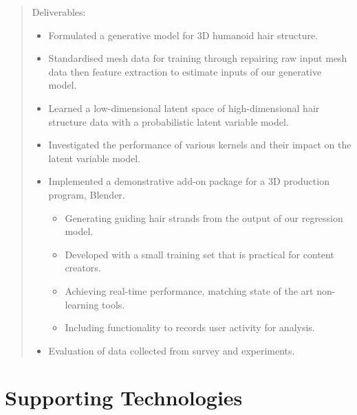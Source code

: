 \documentclass[ %
author={Dillon Keith Diep},
supervisor={Dr. Carl Henrik Ek},
degree={MEng},
title={ART-CG Hair:},
subtitle={Assisted Real-time Content Generation of Stylised Virtual Hair},
type={Research},
year={2017} ]{dissertation}
\begin{document}
	\begin{quote}
		Deliverables:
		\begin{itemize}
			\item Formulated a generative model for 3D humanoid hair structure.
			\item Standardised mesh data for training through repairing raw input mesh data then feature extraction to estimate inputs of our generative model.
			\item Learned a low-dimensional latent space of high-dimensional hair structure data with a probabilistic latent variable model.
			\item Investigated the performance of various kernels and their impact on the latent variable model.
			\item Implemented a demonstrative add-on package for a 3D production program, Blender.
			\begin{itemize}
				\item Generating guiding hair strands from the output of our regression model.
				\item Developed with a small training set that is practical for content creators.
				\item Achieving real-time performance, matching state of the art non-learning tools.
				\item Including functionality to records user activity for analysis.
			\end{itemize}
			\item Evaluation of data collected from survey and experiments.
		\end{itemize}
	\end{quote}
	
	
	\chapter*{Supporting Technologies}
	
\end{document}
